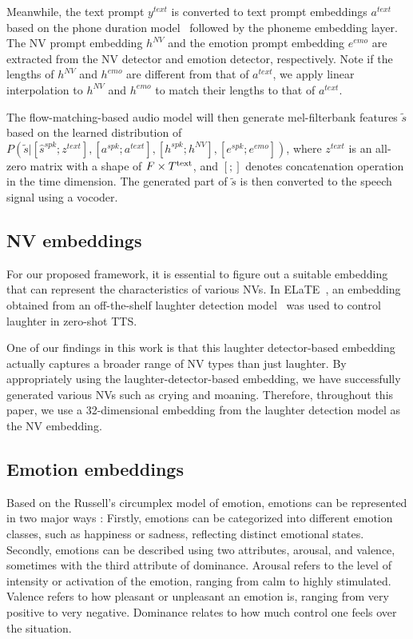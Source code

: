 Meanwhile, the text prompt $y^{text}$ is converted to text prompt embeddings $a^{text}$ based on the phone duration model~\cite{le2024voicebox} followed by the phoneme embedding layer. The NV prompt embedding $h^{NV}$ and the emotion prompt embedding $e^{emo}$ are extracted from the NV detector and emotion detector, respectively. 
Note if the lengths of $h^{NV}$ and $h^{emo}$ are different from that of $a^{text}$, we apply linear interpolation to $h^{NV}$ and $h^{emo}$ to match their lengths to that of $a^{text}$.

The flow-matching-based audio model will then generate mel-filterbank features $\tilde{s}$ based on the learned distribution of $P(\tilde{s}|[\hat{s}^{spk}; z^{text}], [a^{spk}; a^{text}], [h^{spk}; h^{NV}], [e^{spk}; e^{emo}])$, where $z^{text}$ 
is an all-zero matrix with a shape of ${F\times T^{\rm text}}$,
and $[;]$ denotes concatenation operation in the time dimension. The generated part of $\tilde{s}$ is then converted to the speech signal using a vocoder.

\vspace{-.5em}
\subsection{NV embeddings}
\label{ssec:nv_feature}

For our proposed framework, it is essential to figure out a suitable embedding that can represent the characteristics of various NVs. In ELaTE~\cite{kanda2024making}, an embedding obtained from an off-the-shelf laughter detection model~\cite{ryokai2018capturing, gillick2021robust} was used to control laughter in zero-shot TTS.

One of our findings in this work is that this laughter detector-based embedding actually captures a broader range of NV types than just laughter. By appropriately using the laughter-detector-based embedding, we have successfully generated various NVs such as crying and moaning.
Therefore, throughout this paper, we use a 32-dimensional embedding from the laughter detection model as the NV embedding.

\vspace{-.5em}
\subsection{Emotion embeddings}
\label{ssec:feature}
\vspace{-.5em}
Based on the Russell's circumplex model of emotion,
emotions can be represented in two major ways \cite{russell1980circumplex}:
Firstly, emotions can be categorized into different emotion classes, such as happiness or sadness, reflecting distinct emotional states. 
Secondly, emotions can be described using two attributes, arousal, and valence, sometimes with the third attribute of dominance. 
Arousal refers to the level of intensity or activation of the emotion, ranging from calm to highly stimulated.
Valence refers to how pleasant or unpleasant an emotion is, ranging from very positive to very negative.
Dominance relates to how much control one feels over the situation.

